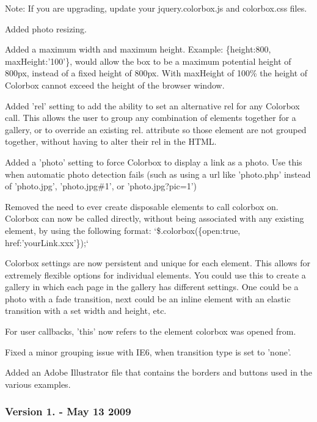 \begin{DoxyItemize}
\item Note\-: If you are upgrading, update your jquery.\-colorbox.\-js and colorbox.\-css files.
\item Added photo resizing.
\item Added a maximum width and maximum height. Example\-: \{height\-:800, max\-Height\-:'100'\}, would allow the box to be a maximum potential height of 800px, instead of a fixed height of 800px. With max\-Height of 100\% the height of Colorbox cannot exceed the height of the browser window.
\item Added 'rel' setting to add the ability to set an alternative rel for any Colorbox call. This allows the user to group any combination of elements together for a gallery, or to override an existing rel. attribute so those element are not grouped together, without having to alter their rel in the H\-T\-M\-L.
\item Added a 'photo' setting to force Colorbox to display a link as a photo. Use this when automatic photo detection fails (such as using a url like 'photo.\-php' instead of 'photo.\-jpg', 'photo.\-jpg\#1', or 'photo.\-jpg?pic=1')
\item Removed the need to ever create disposable elements to call colorbox on. Colorbox can now be called directly, without being associated with any existing element, by using the following format\-: `\$.colorbox(\{open\-:true, href\-:'your\-Link.\-xxx'\});`
\item Colorbox settings are now persistent and unique for each element. This allows for extremely flexible options for individual elements. You could use this to create a gallery in which each page in the gallery has different settings. One could be a photo with a fade transition, next could be an inline element with an elastic transition with a set width and height, etc.
\item For user callbacks, 'this' now refers to the element colorbox was opened from.
\item Fixed a minor grouping issue with I\-E6, when transition type is set to 'none'.
\item Added an Adobe Illustrator file that contains the borders and buttons used in the various examples.
\end{DoxyItemize}

\subsubsection*{Version 1. -\/ May 13 2009}


